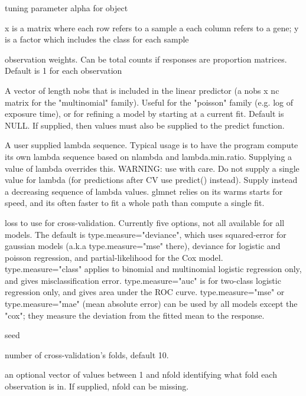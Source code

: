 \documentclass[letterpaper]{book}
\begin{document}
%
\begin{Arguments}
\begin{ldescription}
\item[\code{parms}] tuning parameter alpha for  object
\item[\code{x,y}] x is a matrix where each row refers to a sample a each
column refers to a gene; y is a factor which includes the class for
each sample
\item[\code{weights}] observation weights. Can be total counts if responses are proportion matrices. Default is 1 for each observation
\item[\code{offset}] A vector of length nobs that is included in the linear predictor (a nobs x nc matrix for the "multinomial" family). Useful for the "poisson" family (e.g. log of exposure time), or for refining a model by starting at a current fit. Default is NULL. If supplied, then values must also be supplied to the predict function.
\item[\code{lambda}] A user supplied lambda sequence. Typical usage is to have the program compute its own lambda sequence based on nlambda and lambda.min.ratio. Supplying a value of lambda overrides this. WARNING: use with care. Do not supply a single value for lambda (for predictions after CV use predict() instead). Supply instead a decreasing sequence of lambda values. glmnet relies on its warms starts for speed, and its often faster to fit a whole path than compute a single fit.
\item[\code{type.measure}] loss to use for cross-validation. Currently five options, not all available for all models. The default is type.measure="deviance", which uses squared-error for gaussian models (a.k.a type.measure="mse" there), deviance for logistic and poisson regression, and partial-likelihood for the Cox model. type.measure="class" applies to binomial and multinomial logistic regression only, and gives misclassification error. type.measure="auc" is for two-class logistic regression only, and gives area under the ROC curve. type.measure="mse" or type.measure="mae" (mean absolute error) can be used by all models except the "cox"; they measure the deviation from the fitted mean to the response.
\item[\code{seed}] seed
\item[\code{nfolds}] number of cross-validation's folds, default 10.
\item[\code{foldid}] an optional vector of values between 1 and nfold identifying what fold each observation is in. If supplied, nfold can be missing.

\end{ldescription}
\end{Arguments}
\end{document}
